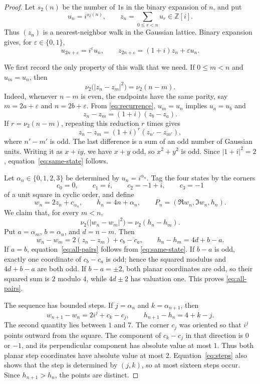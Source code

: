 \documentclass[10pt]{article}
\newcommand{\Z}{\mathbb Z}
\newcommand{\vTwo}{\nu_2}
\begin{document}
\begin{proof}
Let $s_2(n)$ be the number of $1$s in the binary expansion of $n$, and put
\[
 u_n=i^{s_2(n)},\qquad z_n=\sum_{0\leq r<n}u_r\in\Z[i].
\]
Thus $(z_n)$ is a nearest-neighbor walk in the Gaussian lattice.  Binary
expansion gives, for $\varepsilon\in\{0,1\}$,
\begin{equation}\label{eq:recurrence}
 u_{2n+\varepsilon}=i^\varepsilon u_n,
 \qquad z_{2n+\varepsilon}=(1+i)z_n+\varepsilon u_n.
\end{equation}

We first record the only property of this walk that we need.  If $0\leq m<n$
and $u_m=u_n$, then
\begin{equation}\label{eq:same-state}
 \vTwo\bigl(|z_n-z_m|^2\bigr)=\vTwo(n-m).
\end{equation}
Indeed, whenever $n-m$ is even, the endpoints have the same parity, say
$m=2a+\varepsilon$ and $n=2b+\varepsilon$.  From
\eqref{eq:recurrence}, $u_m=u_n$ implies $u_a=u_b$ and
\[
 z_n-z_m=(1+i)(z_b-z_a).
\]
If $r=\vTwo(n-m)$, repeating this reduction $r$ times gives
\[
 z_n-z_m=(1+i)^r(z_{n'}-z_{m'}),
\]
where $n'-m'$ is odd.  The last difference is a sum of an odd number of
Gaussian units.  Writing it as $x+iy$, we have $x+y$ odd, so $x^2+y^2$ is
odd.  Since $|1+i|^2=2$, equation~\eqref{eq:same-state} follows.

Let $\alpha_n\in\{0,1,2,3\}$ be determined by $u_n=i^{\alpha_n}$.  Tag the
four states by the corners
\[
 c_0=0,\qquad c_1=i,\qquad c_2=-1+i,\qquad c_3=-1
\]
of a unit square in cyclic order, and define
\begin{equation}\label{eq:points}
 w_n=2z_n+c_{\alpha_n},\qquad
 h_n=4n+\alpha_n,\qquad
 P_n=(\Re w_n,\Im w_n,h_n).
\end{equation}
We claim that, for every $m<n$,
\begin{equation}\label{eq:all-pairs}
 \vTwo\bigl(|w_n-w_m|^2\bigr)=\vTwo(h_n-h_m).
\end{equation}
Put $a=\alpha_m$, $b=\alpha_n$, and $d=n-m$.  Then
\[
 w_n-w_m=2(z_n-z_m)+c_b-c_a,
 \qquad h_n-h_m=4d+b-a.
\]
If $a=b$, equation~\eqref{eq:all-pairs} follows from
\eqref{eq:same-state}.  If $b-a$ is odd, exactly one coordinate of
$c_b-c_a$ is odd; hence the squared modulus and $4d+b-a$ are both odd.  If
$b-a=\pm2$, both planar coordinates are odd, so their squared sum is $2$
modulo $4$, while $4d\pm2$ has valuation one.  This proves
\eqref{eq:all-pairs}.

The sequence has bounded steps.  If $j=\alpha_n$ and $k=\alpha_{n+1}$, then
\begin{equation}\label{eq:steps}
 w_{n+1}-w_n=2i^j+c_k-c_j,
 \qquad h_{n+1}-h_n=4+k-j.
\end{equation}
The second quantity lies between $1$ and $7$.  The corner $c_j$ was oriented
so that $i^j$ points outward from the square.  The component of $c_k-c_j$ in
that direction is $0$ or $-1$, and its perpendicular component has absolute
value at most $1$.  Thus both planar step coordinates have absolute value at
most $2$.  Equation~\eqref{eq:steps} also shows that the step is determined by
$(j,k)$, so at most sixteen steps occur.  Since $h_{n+1}>h_n$, the points are
distinct.


\end{proof}
\end{document}
